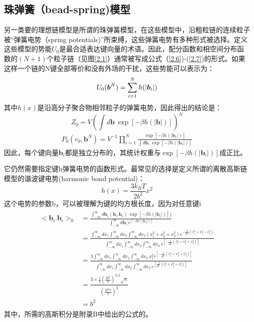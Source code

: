 \subsection{珠弹簧（bead-spring)模型}
另一类要的理想链模型是所谓的珠弹簧模型，在这些模型中，沿粗粒链的连续粒子被“弹簧电势（spring potentials)”所束缚，这些弹簧电势有多种形式被选择。定义这些模型的势能$U_{0}$是最合适表达键向量的术语。因此，配分函数和相空间分布函数的$(N+1)$个粒子链（见图\ref{2.1}）通常被写成公式（\ref{2.6})-(\ref{2.7})的形式。如果这样一个链的N键全部等价和没有外场的干扰，这些势能可以表示为：
\begin{equation}\label{2.26}
\begin{split}
U_{0}(\bm{b}^{N})= \sum_{i=1}^{N}h(|\bm{b}_{i}|)
\end{split}
\end{equation}
其中$h(x)$是沿高分子聚合物相邻粒子的弹簧电势，因此得出的结论是：
\begin{equation}\label{2.27}
Z_{0}=V(\int d\mathbf{b}~\exp[-\beta h(|\mathbf{b}|)])^N 
\end{equation}
\begin{equation}\label{2.28}
\begin{split}		
P_{0} (r_{0},\mathbf{b}^N) =V^{-1} \prod_{i=1}^{N} \frac{\exp[-\beta h(|\mathbf{b}_{i}|)]}{\int d \mathbf{b}_{i}~\exp[-\beta h(|\mathbf{b}_{i}|)]}
\end{split}
\end{equation}
因此，每个键向量$\mathbf{b}_{i}$都是独立分布的，其统计权重与$\exp[-\beta h(|\mathbf{b}_{i}|)]$成正比。 

它仍然需要指定键h弹簧电势的函数形式。最常见的选择是定义所谓的离散高斯链模型的谐波键电势(harmonic bond potential)： 
\begin{equation}\label{2.29}
h(x)=\frac{3k_{B}T}{2b^2} x^2  
\end{equation}
这个电势的参数b，可以被理解为键的均方根长度，因为对任意键i 
\begin{align}\label{2.30}
\begin{split}
<\mathbf{b}_{i}.\mathbf{b}_{i}>_{0}&= \frac{\int_{-\infty}^{\infty} d\mathbf{b}_{i}(\mathbf{b}_{i}.\mathbf{b}_{i})~\exp[-\beta h(|\mathbf{b}_{i}|)])}{\int_{-\infty}^{\infty} d\mathbf{b}_{i}~e^[-\beta h(|\mathbf{b}_{i}|)]}\\ &=\frac{\int_{-\infty}^{\infty}dx_1\int_{-\infty}^{\infty}dx_2\int_{-\infty}^{\infty}dx_3(x_1^2+x_2^2+x_3^2)e^{-\frac{3}{2b^2}(x_1^2+x_2^2+x_3^2)}}{\int_{-\infty}^{\infty}dx_1\int_{-\infty}^{\infty}dx_2\int_{-\infty}^{\infty}dx_3~e^[-\frac{3}{2b^2}(x_1^2+x_2^2+x_3^2)]}\\ &=\frac{3\int_{-\infty}^{\infty}dx_1\int_{-\infty}^{\infty}dx_2\int_{-\infty}^{\infty}dx_3~x_1^2e^[-\frac{3}{2b^2}(x_1^2+x_2^2+x_3^2)]}{\int_{-\infty}^{\infty}dx_1\int_{-\infty}^{\infty}dx_2\int_{-\infty}^{\infty}dx_3~e^[\frac{-3}{2b^2}(x_1^2+x_2^2+x_3^2)]}\\ &=\frac{3 \times\frac{1}{2} (\frac{2b^2}{3})^{3/2}\sqrt{\pi}}{(\frac{2b^2\pi}{3})^{\frac{1}{2}}}\\ &=b^2
\end{split}
\end{align}
其中，所需的高斯积分是附录B中给出的公式的。

